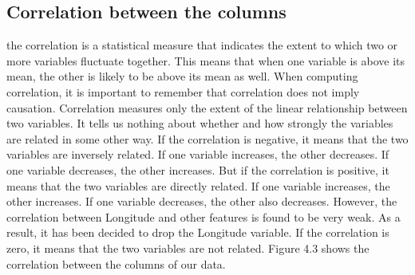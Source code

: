 \documentclass{report}
\begin{document}
\subsection{Correlation between the columns}

the correlation is a statistical measure that indicates the extent to which two or more variables fluctuate together. This means that when one variable is above its mean, the other is likely to be above its mean as well. When computing correlation, it is important to remember that correlation does not imply causation. Correlation measures only the extent of the linear relationship between two variables. It tells us nothing about whether and how strongly the variables are related in some other way. If the correlation is negative, it means that the two variables are inversely related. If one variable increases, the other decreases. If one variable decreases, the other increases. But if the correlation is positive, it means that the two variables are directly related. If one variable increases, the other increases. If one variable decreases, the other also decreases. However, the correlation between Longitude and other features is found to be very weak. As a result, it has been decided to drop the Longitude variable.
If the correlation is zero, it means that the two variables are not related. Figure 4.3 shows the correlation between the columns of our data.
\end{document}
